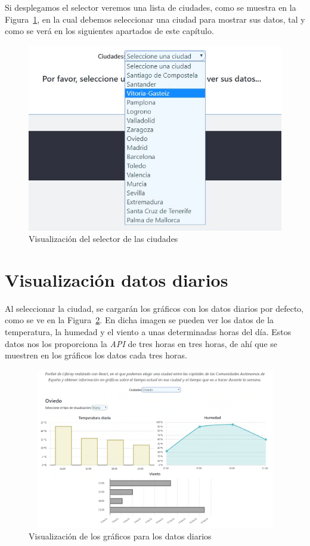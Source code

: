 \documentclass[a4paper, 12pt]{book}
\begin{document}
\vspace{5mm}
Si desplegamos el selector veremos una lista de ciudades, como se muestra en la Figura~\ref{fig:seleccion_ciudad}, en la cual debemos seleccionar una ciudad para mostrar sus datos, tal y como se verá en los siguientes apartados de este capítulo.
\begin{figure}[h]
  \centering
  \includegraphics{img_usadas/seleccion_ciudad.png}
  \caption{Visualización del selector de las ciudades}
  \label{fig:seleccion_ciudad}
\end{figure}



\section{Visualización datos diarios}
\label{sec:visualizacion-diaria}
Al seleccionar la ciudad, se cargarán los gráficos con los datos diarios por defecto, como se ve en la Figura~\ref{fig:pantalla_diaria}. En dicha imagen se pueden ver los datos de la temperatura, la humedad y el viento a unas determinadas horas del día. Estos datos nos los proporciona la \textit{API} de tres horas en tres horas, de ahí que se muestren en los gráficos los datos cada tres horas.
\begin{figure}[h]
  \centering
  \includegraphics[width=13cm, height=7cm]{img_usadas/pantalla_diaria.png}
  \caption{Visualización de los gráficos para los datos diarios}
  \label{fig:pantalla_diaria}
\end{figure}
\end{document}
